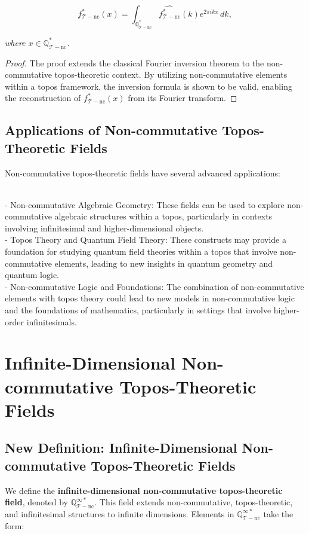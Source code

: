 \documentclass{article}
\begin{document}
\[
f_{\mathcal{T}-\text{nc}}^*(x) = \int_{\mathbb{Q}_{\mathcal{T}-\text{nc}}^*} \widehat{f_{\mathcal{T}-\text{nc}}^*}(k) e^{2\pi i k x} \, dk,
\]

\textit{where \(x \in \mathbb{Q}_{\mathcal{T}-\text{nc}}^*\).}

\begin{proof}
The proof extends the classical Fourier inversion theorem to the non-commutative topos-theoretic context. By utilizing non-commutative elements within a topos framework, the inversion formula is shown to be valid, enabling the reconstruction of \(f_{\mathcal{T}-\text{nc}}^*(x)\) from its Fourier transform.
\end{proof}

\subsection{Applications of Non-commutative Topos-Theoretic Fields}
Non-commutative topos-theoretic fields have several advanced applications:

{\ }\\
- Non-commutative Algebraic Geometry: These fields can be used to explore non-commutative algebraic structures within a topos, particularly in contexts involving infinitesimal and higher-dimensional objects.
{\ }\\
- Topos Theory and Quantum Field Theory: These constructs may provide a foundation for studying quantum field theories within a topos that involve non-commutative elements, leading to new insights in quantum geometry and quantum logic.
{\ }\\
- Non-commutative Logic and Foundations: The combination of non-commutative elements with topos theory could lead to new models in non-commutative logic and the foundations of mathematics, particularly in settings that involve higher-order infinitesimals.

\section{Infinite-Dimensional Non-commutative Topos-Theoretic Fields}
\subsection{New Definition: Infinite-Dimensional Non-commutative Topos-Theoretic Fields}
We define the \textbf{infinite-dimensional non-commutative topos-theoretic field}, denoted by \(\mathbb{Q}_{\mathcal{T}-\text{nc}}^{\infty *}\). This field extends non-commutative, topos-theoretic, and infinitesimal structures to infinite dimensions. Elements in \(\mathbb{Q}_{\mathcal{T}-\text{nc}}^{\infty *}\) take the form:
\end{document}
